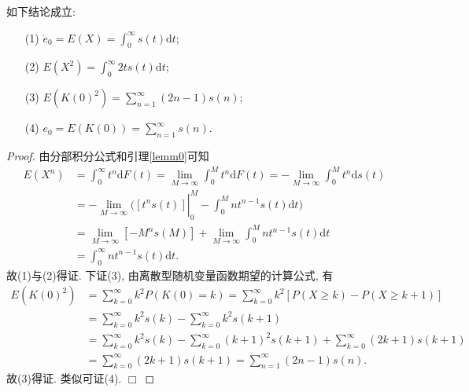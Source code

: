\documentclass[a4paper,10pt]{ctexbook}
\def\qed{\hfill$\Box$\medskip}
\begin{document}
\begin{proposition}如下结论成立:
    \begin{enumerate}
        \item[(1)] $\mathring{e}_0 = E(X) = \int_0^{\infty}s(t)\mathrm{d}t;$
        \item[(2)] $E(X^2) = \int_{0}^{\infty} 2ts(t)\mathrm{d}t;$
        \item[(3)] $E(K(0)^2) = \sum_{n = 1}^{\infty} (2n-1)s(n);$
        \item[(4)] $e_0=E(K(0)) = \sum_{n = 1}^{\infty} s(n).$
    \end{enumerate}
\end{proposition}
\begin{proof}由分部积分公式和引理\ref{lemm0}可知
    \begin{equation*}
        \begin{aligned}
            {E}\left(X^{n}\right) & =\int_0^\infty t^n\mathrm{d}F(t)=\lim_{M\to\infty}\int_0^Mt^n\mathrm{d}F(t)=-\lim_{M\to\infty}\int_0^Mt^n\mathrm{d}s(t) \\
                                  & \left.=-\lim_{M\to\infty}(\left[t^ns(t)\right]\right|_0^M-\int_0^Mnt^{n-1}s(t)\mathrm{d}t)                              \\
                                  & =\lim_{M\to\infty}[-M^ns(M)]+\lim_{M\to\infty}\int_0^Mnt^{n-1}s(t)\mathrm{d}t                                           \\
                                  & =\int_0^\infty nt^{n-1}s(t)\mathrm{d}t.
        \end{aligned}
    \end{equation*}
    故(1)与(2)得证. 下证(3), 由离散型随机变量函数期望的计算公式, 有
    \begin{align*}
        E(K(0)^2) & = \sum_{k = 0}^{\infty} k^2P(K(0) = k)
        = \sum_{k = 0}^{\infty} k^2[P(X \geq k) - P(X \geq k+1)]                                                            \\
                  & = \sum_{k = 0}^{\infty} k^2s(k) - \sum_{k = 0}^{\infty} k^2s(k+1)                                       \\
                  & =\sum_{k = 0}^{\infty} k^2s(k) - \sum_{k = 0}^{\infty} (k+1)^2s(k+1)+\sum_{k = 0}^{\infty} (2k+1)s(k+1) \\
                  & = \sum_{k = 0}^{\infty} (2k+1)s(k+1)                              = \sum_{n = 1}^{\infty} (2n-1)s(n).
    \end{align*}
    故(3)得证. 类似可证(4). \qed
\end{proof}
\end{document}
